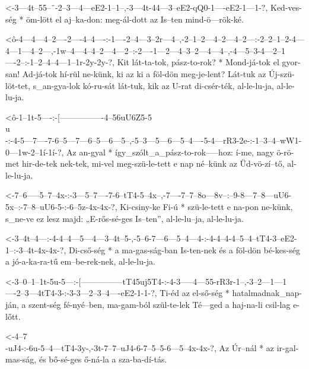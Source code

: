   {<-3---4t--55--¨-2--3---4---eE2-1--1--,-3---4t-44---3--eE2-qQ0-1----eE2-1---1-?,}
  {  Ked-ves-ség * öm-lött el aj--ka-don: meg-ál-dott az Is--ten mind-ö---rök-ké.}


  {<ô-4---4---4--2----2----4--4----:-1----2--4---3--2r---4--,-2--1--2---4--2---4--2---:-2--2--1--2-4---4---1---4--2---,-1w--4---4--4--2---4---2--:-2----1---2---4--3--2---4---4--,-4---5--3-4---2--1----2--:-1--2--4--4---1--1r-2y-2y-?,}
  {   Kit lát-ta-tok, pász-to-rok? * Mond-já-tok el gyor-san! Ad-já-tok hí-rül ne-künk, ki az ki a föl-dön meg-je-lent? Lát-tuk az Új-szü-löt-tet, s_an-gya-lok kó-ru-sát lát-tuk, kik az U-rat di-csér-ték, al-le-lu-ja, al-le-lu-ja.}

  {<ô-1--1t-5----:-[----------------4--56uU6Z5-5\\u\\-:-4-5---7----7-6--5---7---6--5---6---5--,-5--3---5---6---5--4----5-4---rR3-2e-:-1--3--4--wW1-0---1w-2--1í-1í-?,}
  {   Az an-gyal * így_szólt_a_pász-to-rok-----hoz:     í-me, nagy ö-rö-met hir-de-tek nek-tek, mi-vel meg-szü-le-tett e nap né--künk az Üd-vö-zí--tő, al-le-lu-ja.}

  {<-7--6-----5--7--4x-:-3---5--7----7-6--tT4-5--4x--,-7----7--7--8o---8v--:--9-8---7--8---uU6-5x--:-7--8--uU6-5-:-6--5z-4x-4x-?,}
  {  Ki-csiny-ke Fi-ú  * szü-le-tett e na-pon ne-künk, s_ne-ve ez lesz majd: „E-rős-sé-ges Is--ten”, al-le-lu--ja, al-le-lu-ja.}

  {<-3--4t--4---:-4-4--4---5---4---3--4t--5-,-5--6-7---6---5--4---4-:-4-4--4-4--5--4--tT4-3--eE2-1--:-3--4t-4x-4x-?,}
  {  Di-cső-ség * a ma-gas-ság-ban Is-ten-nek és a föl-dön bé-kes-ség a jó-a-ka-ra-tű em--be-rek-nek, al-le-lu-ja.}


  {<-3--0--1--1t-5u-5---:-[---------------tT45uj5T4-:-4-3-----4---55-rR3r-1--,-3--2---1---1----2--3---4tT4-3-:-3-3---2--3--4----eE2-1-1-?,}
  {  Ti-éd az el-ső-ség * hatalmadnak_nap-ján,        a szent-ség fé-nyé--ben, ma-gam-ból szül-te-lek Té---ged a haj-na-li csil-lag e-lőtt.}

  {<-4--7\\-uJ4-:-6u-5--4---tT4-3y-,-3t-7--7--uJ4-6-7--5--5-6---5--4x-4x-?,}
  {  Az Úr--nál * az ir-gal-mas-ság, és bő-sé-ges ő-ná-la a sza-ba-dí-tás.}

